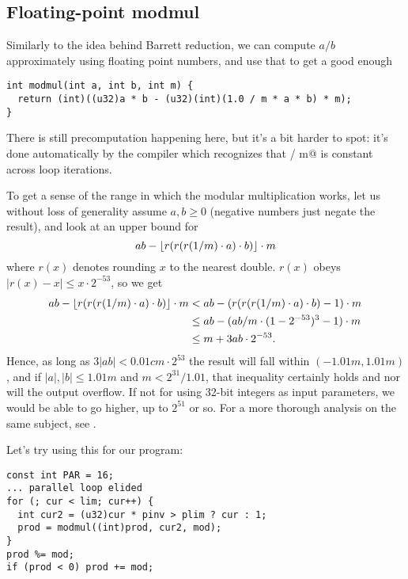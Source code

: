 \subsection{Floating-point modmul}

Similarly to the idea behind Barrett reduction, we can compute $a / b$ approximately using floating point numbers, and use that to get a good enough \verb@a % b@, in the range $(-(1+\epsilon)b, (1+\epsilon)b)$. We combine multiplication and reduction in order to keep to 32-bit integers, making use of integer overflow:

\begin{lstlisting}
int modmul(int a, int b, int m) {
  return (int)((u32)a * b - (u32)(int)(1.0 / m * a * b) * m);
}
\end{lstlisting}

There is still precomputation happening here, but it's a bit harder to spot: it's done automatically by the compiler which recognizes that  / m@ is constant across loop iterations.

To get a sense of the range in which the modular multiplication works, let us without loss of generality assume $a,b \ge 0$ (negative numbers just negate the result), and look at an upper bound for
\[ ab - \lfloor r(r(r(1/m)\cdot a)\cdot b)\rfloor \cdot m \]
where $r(x)$ denotes rounding $x$ to the nearest double.
$r(x)$ obeys $|r(x) - x| \le x \cdot 2^{-53}$, so we get
\begin{align*}
ab - \lfloor r(r(r(1/m)\cdot a)\cdot b)\rfloor \cdot m
&< ab - (r(r(r(1/m)\cdot a)\cdot b) - 1) \cdot m \\
&\le ab - (ab/m \cdot (1 - 2^{-53})^3 - 1) \cdot m \\
&\le m + 3ab \cdot 2^{-53}.
\end{align*}
Hence, as long as $3|ab| < 0.01 c m \cdot 2^{53}$ the result will fall within $(-1.01m, 1.01m)$, and if $|a|,|b| \le 1.01 m$ and $m < 2^{31} / 1.01$, that inequality certainly holds and nor will the output overflow. If not for using 32-bit integers as input parameters, we would be able to go higher, up to $2^{51}$ or so. For a more thorough analysis on the same subject, see \cite{modmulproof}.

Let's try using this for our program:

\begin{lstlisting}
const int PAR = 16;
... parallel loop elided
for (; cur < lim; cur++) {
  int cur2 = (u32)cur * pinv > plim ? cur : 1;
  prod = modmul((int)prod, cur2, mod);
}
prod %= mod;
if (prod < 0) prod += mod;
\end{lstlisting}

